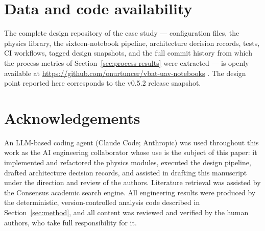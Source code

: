 \documentclass[11pt,a4paper]{article}
\begin{document}
\section*{Data and code availability}
The complete design repository of the case study --- configuration
files, the physics library, the sixteen-notebook pipeline, architecture
decision records, tests, CI workflows, tagged design snapshots, and the
full commit history from which the process metrics of
Section~\ref{sec:process-results} were extracted --- is openly
available at \url{https://github.com/onurtuncer/vbat-uav-notebooks}
\citep{tuncer2026vbat}. The design point reported here corresponds to
the v0.5.2 release snapshot.

\section*{Acknowledgements}
An LLM-based coding agent (Claude Code; Anthropic) was used throughout
this work as the AI engineering collaborator whose use is the subject
of this paper: it implemented and refactored the physics modules,
executed the design pipeline, drafted architecture decision records,
and assisted in drafting this manuscript under the direction and review
of the authors. Literature retrieval was assisted by the Consensus
academic search engine. All engineering results were produced by the
deterministic, version-controlled analysis code described in
Section~\ref{sec:method}, and all content was reviewed and verified by
the human authors, who take full responsibility for it.



\end{document}

